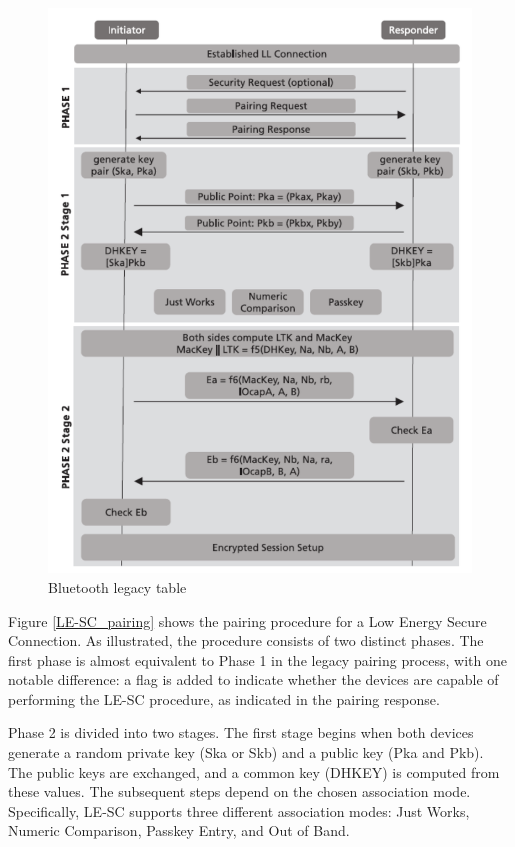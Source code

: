 \documentclass{Configuration_Files/PoliMi3i_thesis}
\begin{document}
\begin{figure}[H]
    \centering
    \includegraphics[scale=0.7]{Bluetooth_Security/5.png}
    \caption{Bluetooth legacy table}
    \label{bluetooth_sec_5}
\end{figure}

Figure \ref{LE-SC_pairing} shows the pairing procedure for a Low Energy Secure Connection. As illustrated, the procedure consists of two distinct phases. The first phase is almost equivalent to Phase 1 in the legacy pairing process, with one notable difference: a flag is added to indicate whether the devices are capable of performing the LE-SC procedure, as indicated in the pairing response. 

Phase 2 is divided into two stages. The first stage begins when both devices generate a random private key (Ska or Skb) and a public key (Pka and Pkb). The public keys are exchanged, and a common key (DHKEY) is computed from these values. The subsequent steps depend on the chosen association mode. Specifically, LE-SC supports three different association modes: Just Works, Numeric Comparison, Passkey Entry, and Out of Band.
\end{document}
